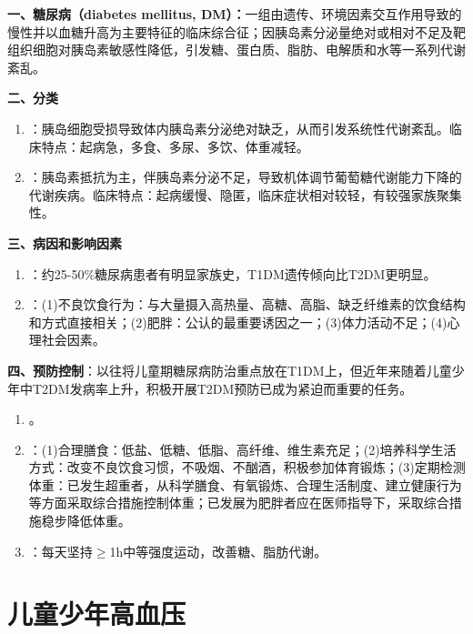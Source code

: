 \begin{keybox}
\textbf{一、糖尿病（diabetes mellitus, DM）：}一组由遗传、环境因素交互作用导致的慢性并以血糖升高为主要特征的临床综合征；因胰岛素分泌量绝对或相对不足及靶组织细胞对胰岛素敏感性降低，引发糖、蛋白质、脂肪、电解质和水等一系列代谢紊乱。

\textbf{二、分类}
\begin{enumerate}[leftmargin=*]
    \item {}：胰岛细胞受损导致体内胰岛素分泌绝对缺乏，从而引发系统性代谢紊乱。临床特点：起病急，多食、多尿、多饮、体重减轻。
    \item {}：胰岛素抵抗为主，伴胰岛素分泌不足，导致机体调节葡萄糖代谢能力下降的代谢疾病。临床特点：起病缓慢、隐匿，临床症状相对较轻，有较强家族聚集性。
\end{enumerate}

\textbf{三、病因和影响因素}
\begin{enumerate}[leftmargin=*]
    \item {}：约25-50\%糖尿病患者有明显家族史，T1DM遗传倾向比T2DM更明显。
    \item {}：(1)不良饮食行为：与大量摄入高热量、高糖、高脂、缺乏纤维素的饮食结构和方式直接相关；(2)肥胖：公认的最重要诱因之一；(3)体力活动不足；(4)心理社会因素。
\end{enumerate}

\textbf{四、预防控制}：以往将儿童期糖尿病防治重点放在T1DM上，但近年来随着儿童少年中T2DM发病率上升，积极开展T2DM预防已成为紧迫而重要的任务。
\begin{enumerate}[leftmargin=*]
    \item {}。
    \item {}：(1)合理膳食：低盐、低糖、低脂、高纤维、维生素充足；(2)培养科学生活方式：改变不良饮食习惯，不吸烟、不酗酒，积极参加体育锻炼；(3)定期检测体重：已发生超重者，从科学膳食、有氧锻炼、合理生活制度、建立健康行为等方面采取综合措施控制体重；已发展为肥胖者应在医师指导下，采取综合措施稳步降低体重。
    \item {}：每天坚持$\geq$1h中等强度运动，改善糖、脂肪代谢。
\end{enumerate}
\end{keybox}

\section{儿童少年高血压}

